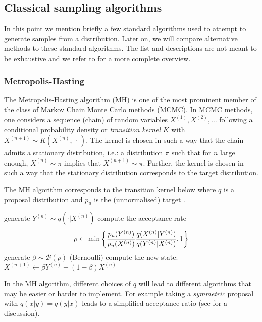 \subsection{\label{point:classical-sampling}Classical sampling algorithms}

In this point we mention briefly a few standard algorithms used to attempt to generate samples from a distribution.
Later on, we will compare alternative methods to these standard algorithms.
The list and descriptions are not meant to be exhaustive and we refer to \citep{robert04, green15} for a more complete overview.

\subsubsection{Metropolis-Hasting}
The Metropolis-Hasting algorithm (MH) is one of the most prominent member of the class of Markov Chain Monte Carlo methods (MCMC). In MCMC methods, one considers a sequence (chain) of random variables $X^{(1)}, X^{(2)},\dots$ following a conditional probability density or \emph{transition kernel} $K$ with $X^{(n+1)} \sim K(X^{(n)}, \,\cdot\,)$. 
The kernel is chosen in such a way that the chain admits a stationary distribution, i.e.: a distribution $\pi$ such that for $n$ large enough, $X^{(n)}\sim \pi$ implies that $X^{(n+1)}\sim\pi$. Further, the kernel is chosen in such a way that the stationary distribution corresponds to the target distribution.

The MH algorithm corresponds to the transition kernel below where $q$ is a proposal distribution and $p_{u}$ is the (unnormalised) target \citep[chapter 6]{robert04}.

\begin{algorithm}[!h]\small
	\caption{\label{alg:mh-kernel}}
	\begin{algorithmic}[1]
		\State generate $Y^{(n)}\sim q(\cdot | X^{(n)})$
		\State compute the acceptance rate
			$$ \rho \leftarrow \min\left\{ {p_{u}(Y^{(n)})\over p_{u}(X^{(n)})}{q(X^{(n)}|Y^{(n)})\over q(Y^{(n)}|X^{(n)})}, 1\right\} $$
		\State generate $\beta\sim \mathcal B(\rho)$ (Bernoulli)
		\State compute the new state: $X^{(n+1)} \leftarrow \beta Y^{(n)} + (1-\beta)X^{(n)} $
	\end{algorithmic}
\end{algorithm}

In the MH algorithm, different choices of $q$ will lead to different algorithms that may be easier or harder to implement. For example taking a \emph{symmetric} proposal with $q(x|y)=q(y|x)$ leads to a simplified acceptance ratio (see \citet{green15} for a discussion).


